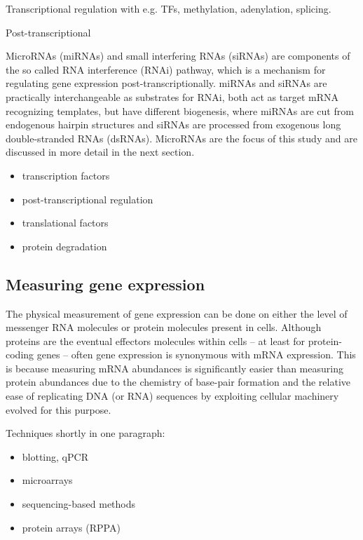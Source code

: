 Transcriptional regulation with e.g. TFs, methylation, adenylation, splicing.

Post-transcriptional

MicroRNAs (miRNAs) and small interfering RNAs (siRNAs) are components of the
so called RNA interference (RNAi) pathway, which is a mechanism for regulating
gene expression post-transcriptionally. miRNAs and siRNAs are practically
interchangeable as substrates for RNAi, both act as target mRNA recognizing
templates, but have different biogenesis, where miRNAs are cut from endogenous hairpin
structures and siRNAs are processed from exogenous long double-stranded RNAs (dsRNAs).
\cite{Du2005} MicroRNAs are the focus of this study and are discussed in more
detail in the next section.


\begin{itemize}
  \item transcription factors
  \item post-transcriptional regulation
  \item translational factors
  \item protein degradation
\end{itemize}




\subsection{Measuring gene expression}\label{measurement-of-gene-expression}

The physical measurement of gene expression can be done on either the level of
messenger RNA molecules or protein molecules present in cells. Although
proteins are the eventual effectors molecules within cells -- at least for
protein-coding genes -- often gene expression is synonymous with mRNA
expression. This is because measuring mRNA abundances is significantly easier than
measuring protein abundances due to the chemistry of base-pair formation
and the relative ease of replicating DNA (or RNA) sequences by
exploiting cellular machinery evolved for this purpose.

Techniques shortly in one paragraph:
\begin{itemize}
  \item blotting, qPCR
  \item microarrays
  \item sequencing-based methods
  \item protein arrays (RPPA)
\end{itemize}





